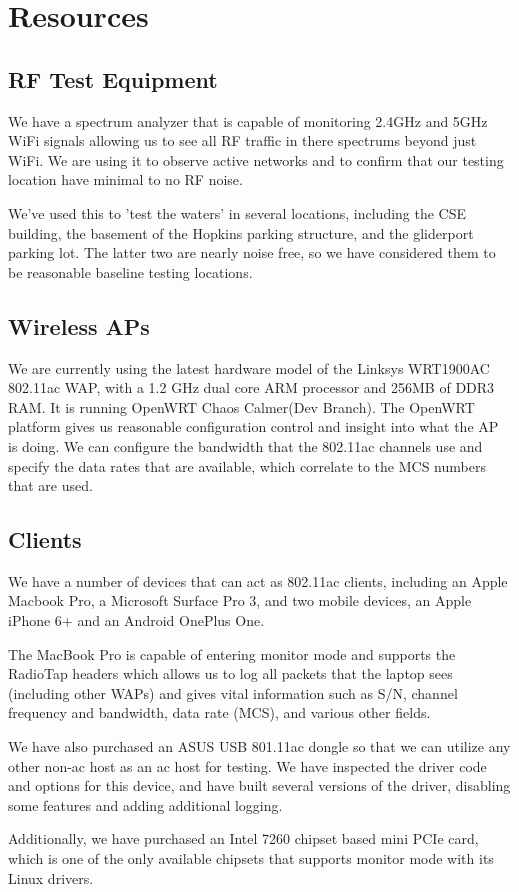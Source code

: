 \section{Resources}

\subsection{RF Test Equipment}

We have a spectrum analyzer that is capable of monitoring 2.4GHz and
5GHz WiFi signals allowing us to see all RF traffic in there spectrums
beyond just WiFi. We are using it to observe active networks and to
confirm that our testing location have minimal to no RF noise.

We've used this to 'test the waters' in several locations, including
the CSE building, the basement of the Hopkins parking structure, and
the gliderport parking lot. The latter two are nearly noise free, so
we have considered them to be reasonable baseline testing locations.

\subsection{Wireless APs}

We are currently using the latest hardware model of the Linksys
WRT1900AC 802.11ac WAP, with a 1.2 GHz dual core ARM processor and
256MB of DDR3 RAM. It is running OpenWRT Chaos Calmer(Dev Branch). The
OpenWRT platform gives us reasonable configuration control and insight
into what the AP is doing. We can configure the bandwidth that the
802.11ac channels use and specify the data rates that are available,
which correlate to the MCS numbers that are used.

\subsection{Clients}

We have a number of devices that can act as 802.11ac clients,
including an Apple Macbook Pro, a Microsoft Surface Pro 3, and two
mobile devices, an Apple iPhone 6+ and an Android OnePlus One.

The MacBook Pro is capable of entering monitor mode and supports the RadioTap
headers which allows us to log all packets that the laptop sees (including other WAPs)
and gives vital information such as S/N, channel frequency and bandwidth, data rate (MCS),
and various other fields.

We have also purchased an ASUS USB 801.11ac dongle so that we can
utilize any other non-ac host as an ac host for testing. We have
inspected the driver code and options for this device, and have built
several versions of the driver, disabling some features and adding
additional logging.

Additionally, we have  purchased an Intel 7260 chipset based mini PCIe
card, which is one of the only available chipsets that supports
monitor mode with its Linux drivers.
